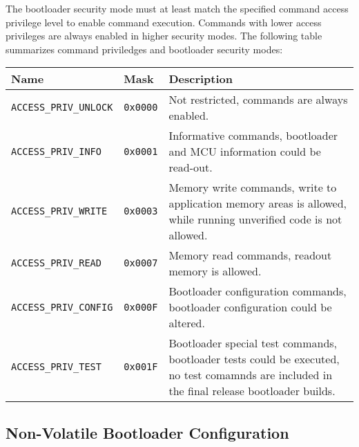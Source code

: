 The bootloader security mode must at least match the specified command access privilege level to enable command execution.
Commands with lower access privileges are always enabled in higher security modes.
The following table summarizes command priviledges and bootloader security modes:

\begin{table*}[!ht]
  \hspace*{-4cm}
  \begin{tabular}{| p{4cm} | p{1.5cm} | p{8.5cm} | }
      \hline
      \rowcolor{SeaGreen3!30!} {\bf Name} & {\bf Mask} & {\bf Description} \\
      \hline
      \hline
      {\tt ACCESS\_PRIV\_UNLOCK} & {\tt 0x0000} & Not restricted, commands are always enabled.\\
      \hline
      {\tt ACCESS\_PRIV\_INFO} & {\tt 0x0001} & Informative commands, bootloader and MCU information could be read-out.\\
      \hline
      {\tt ACCESS\_PRIV\_WRITE} & {\tt 0x0003} & Memory write commands, write to application memory areas is allowed, while running unverified code is not allowed.\\
      \hline
      {\tt ACCESS\_PRIV\_READ} & {\tt 0x0007} & Memory read commands, readout memory is allowed.\\
      \hline
      {\tt ACCESS\_PRIV\_CONFIG} & {\tt 0x000F} & Bootloader configuration commands, bootloader configuration could be altered.\\
      \hline
      {\tt ACCESS\_PRIV\_TEST} & {\tt 0x001F} & Bootloader special test commands, bootloader tests could be executed, no test comamnds are included in the final release bootloader builds.\\
      \hline
  \end{tabular}
\end{table*}



\clearpage
\subsection{Non-Volatile Bootloader Configuration} \label{sec:arch:nvm}

